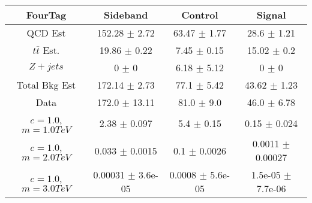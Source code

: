 \begin{footnotesize} 
\begin{tabular}{c|c|c|c} 
FourTag & Sideband & Control & Signal \\ 
\hline\hline 
QCD Est & 152.28 $\pm$ 2.72 & 63.47 $\pm$ 1.77 & 28.6 $\pm$ 1.21\\ 
$t\bar{t}$ Est.  & 19.86 $\pm$ 0.22 & 7.45 $\pm$ 0.15 & 15.02 $\pm$ 0.2\\ 
$Z+jets$ & 0 $\pm$ 0 & 6.18 $\pm$ 5.12 & 0 $\pm$ 0\\ 
Total Bkg Est & 172.14 $\pm$ 2.73 & 77.1 $\pm$ 5.42 & 43.62 $\pm$ 1.23\\ 
Data & 172.0 $\pm$ 13.11 & 81.0 $\pm$ 9.0 & 46.0 $\pm$ 6.78\\ 
$c=1.0$,$m=1.0TeV$ & 2.38 $\pm$ 0.097 & 5.4 $\pm$ 0.15 & 0.15 $\pm$ 0.024\\ 
$c=1.0$,$m=2.0TeV$ & 0.033 $\pm$ 0.0015 & 0.1 $\pm$ 0.0026 & 0.0011 $\pm$ 0.00027\\ 
$c=1.0$,$m=3.0TeV$ & 0.00031 $\pm$ 3.6e-05 & 0.0008 $\pm$ 5.6e-05 & 1.5e-05 $\pm$ 7.7e-06\\ 
\hline\hline 
\end{tabular} 
\end{footnotesize} 
\newline 
